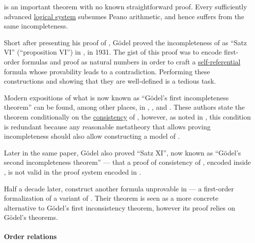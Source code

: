 \begin{remark}\label{rem:thm:peano_arithmetic_incompleteness}
   is an important theorem with no known straightforward proof. Every sufficiently advanced \hyperref[con:logical_system]{logical system} subsumes Peano arithmetic, and hence suffers from the same incompleteness.

  Short after presenting his proof of , G\"odel proved the incompleteness of  as \enquote{Satz VI} (\enquote{proposition VI}) in \cite{Gödel1931UnentscheidbareSätze}, in 1931. The gist of this proof was to encode first-order formulas and proof as natural numbers in order to craft a \hyperref[ex:self_reference]{self-referential} formula whose provability leads to a contradiction. Performing these constructions and showing that they are well-defined is a tedious task.

  Modern expositions of what is now known as \enquote{G\"odel's first incompleteness theorem} can be found, among other places, in \cite[thm. V]{Kleene2002Logic}, \cite[thm. 4.6.16]{Hinman2005Logic}, \cite[thm. 7.7.3]{VanDalen2004LogicAndStructure} and \cite[thm. 5.5.37]{Герасимов2014Вычислимость}. These authors state the theorem conditionally on the \hyperref[def:fol_theory/consistent]{consistency} of , however, as noted in \cite[701]{GowersEtAl2008PrincetonCompanion}, this condition is redundant because any reasonable metatheory that allows proving incompleteness should also allow constructing a model of .

  Later in the same paper, G\"odel also proved \enquote{Satz XI}, now known as \enquote{G\"odel's second incompleteness theorem} --- that a proof of consistency of , encoded inside , is not valid in the proof system encoded in .

  Half a decade later, \textcite[thm. 1.3]{ParisHarrington1977Incompleteness} construct another formula unprovable in  --- a first-order formalization of a variant of . Their theorem is seen as a more concrete alternative to G\"odel's first inconsistency theorem, however its proof relies on G\"odel's theorems.
\end{remark}

\paragraph{Order relations}

